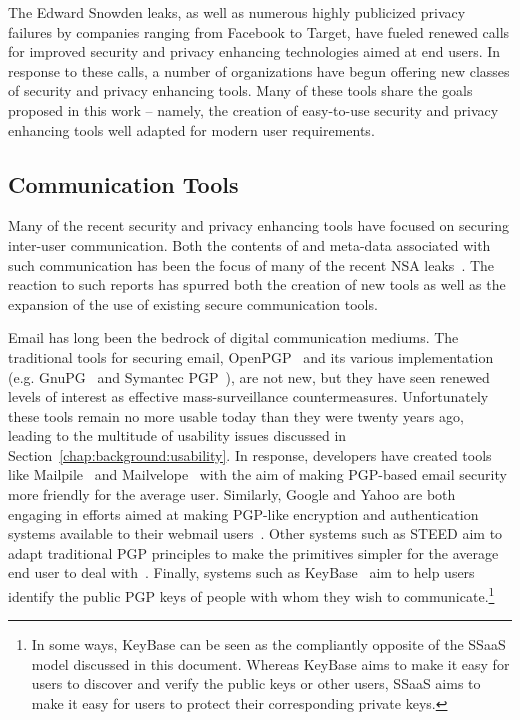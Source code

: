 The Edward Snowden leaks, as well as numerous highly publicized
privacy failures by companies ranging from Facebook to Target, have
fueled renewed calls for improved security and privacy enhancing
technologies aimed at end users. In response to these calls, a number
of organizations have begun offering new classes of security and
privacy enhancing tools. Many of these tools share the goals proposed
in this work -- namely, the creation of easy-to-use security and
privacy enhancing tools well adapted for modern user requirements.

\subsection{Communication Tools}

Many of the recent security and privacy enhancing tools have focused
on securing inter-user communication. Both the contents of and
meta-data associated with such communication has been the focus of
many of the recent NSA leaks~\cite{schneier-metadata}. The reaction to
such reports has spurred both the creation of new tools as well as the
expansion of the use of existing secure communication tools.

Email has long been the bedrock of digital communication mediums. The
traditional tools for securing email, OpenPGP~\cite{openpgp} and its
various implementation (e.g. GnuPG~\cite{gnupg} and Symantec
PGP~\cite{pgp}), are not new, but they have seen renewed levels of
interest as effective mass-surveillance countermeasures. Unfortunately
these tools remain no more usable today than they were twenty years
ago, leading to the multitude of usability issues discussed in
Section~\ref{chap:background:usability}. In response, developers have
created tools like Mailpile~\cite{mailpile} and
Mailvelope~\cite{mailvelope} with the aim of making PGP-based email
security more friendly for the average user. Similarly, Google and
Yahoo are both engaging in efforts aimed at making PGP-like encryption
and authentication systems available to their webmail
users~\cite{google-endtoend, yahoo-endtoend}. Other systems such as
STEED aim to adapt traditional PGP principles to make the primitives
simpler for the average end user to deal
with~\cite{koch2011}. Finally, systems such as KeyBase~\cite{keybase}
aim to help users identify the public PGP keys of people with whom
they wish to communicate.\footnote{In some ways, KeyBase can be seen
  as the compliantly opposite of the SSaaS model discussed in this
  document. Whereas KeyBase aims to make it easy for users to discover
  and verify the public keys or other users, SSaaS aims to make it
  easy for users to protect their corresponding private keys.}

